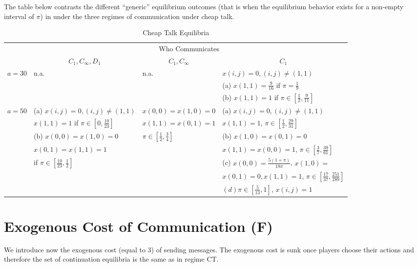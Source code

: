 \documentclass[12pt]{article}
\theoremstyle{definition}
\theoremstyle{remark}
\begin{document}
The table below contrasts the different ``generic'' equilibrium outcomes (that is when the equilibrium behavior exists for a non-empty interval of $\pi$) in under the three regimes of communication under cheap talk.

\renewcommand{\arraystretch}{1.3}
\begin{table}[!h]
	
\begin{center}
	\begin{tabular}{l|l |l |l}
		
	 &\multicolumn{3}{c}{Who Communicates}\\
	 & \multicolumn{1}{c}{\bfseries $C_1,C_\infty,D_1$} & \multicolumn{1}{c}{\bfseries $C_1,C_\infty$ } & \multicolumn{1}{c}{\bfseries $C_1$} \\ \hline
	\multirow{3}{*}{$a=30$} & n.a. & n.a. & 
		$x(i,j)=0, (i,j)\neq (1,1)$ \\
		&&& (a) $x(1,1)=\frac{9}{16}$ if $\pi = \frac{1}{9}$ \\
		&&& (b) $x(1,1)=1$ if $\pi\in \left[ \frac{1}{2},\frac{9}{11} \right]$\\
	 \hline
	 \multirow{7}{*}{$a=50$} & (a) $x(i,j)=0, (i,j)\neq(1,1)$	&  $x(0,0)=x(1,0)=0$ & (a) $x(i,j)=0, (i,j)\neq(1,1)$\\
		& $x(1,1)=1$ if $\pi \in \left[0,\frac{10}{23}\right]$ & $x(1,1)=x(0,1)=1$ & $x(1,1)=1$,  $\pi\in \left[ \frac{1}{2}, \frac{29}{31} \right]$ \\
		&(b) $x(0,0)=x(1,0)=0$ & $\pi\in \left[ \frac{1}{2}, \frac{3}{4} \right]$ & (b) $x(1,0)=x(0,1)=0$ \\
		&$x(0,1)=x(1,1)=1$ && $x(1,1)=x(0,0)= 1$, $\pi\in \left[ \frac{3}{7}, \frac{39}{61} \right]$ \\
		& if $\pi\in\left[\frac{10}{23},\frac{1}{2}\right]$ && (c) $x(0,0)=\frac{5(1+\pi)}{18\pi}$, $x(1,0)=$\\
			&&& $x(0,1)=0,x(1,1)=1$, $\pi\in \left[ \frac{17}{37}, \frac{251}{289} \right]$\\	&&& $(d) \pi\in \left[ \frac{5}{13}, 1 \right]$, $x(i,j)=1$\\
	 \hline
	\end{tabular}
	\end{center}
\caption{Cheap Talk Equilibria}
\end{table}

\section{Exogenous Cost of Communication (F)} \label{sec:exogenous_cost_of_communication} 
We introduce now the exogenous cost (equal to $3$) of sending messages. The exogenous cost is sunk once players choose their actions and therefore the set of continuation equilibria is the same as in regime CT.
\end{document}
